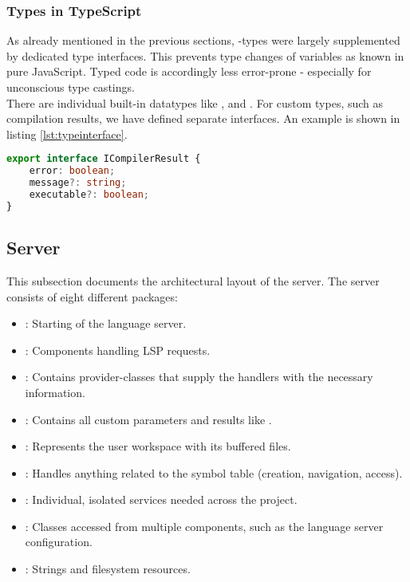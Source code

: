 \subsubsection{Types in TypeScript}
As already mentioned in the previous sections, -types were largely supplemented by dedicated type interfaces.
This prevents type changes of variables as known in pure JavaScript.
Typed code is accordingly less error-prone - especially for unconscious type castings. \\

There are individual built-in datatypes like ,  and  \cite{ts-types}.
For custom types, such as compilation results, we have defined separate interfaces.
An example is shown in listing \ref{lst:typeinterface}.

\begin{lstlisting}[language=typescript, caption={Type Interface Supplementing \code{any}-types}, captionpos=b, label={lst:typeinterface}]
export interface ICompilerResult {
    error: boolean;
    message?: string;
    executable?: boolean;
}
\end{lstlisting}




\subsection{Server}
This subsection documents the architectural layout of the server.
The server consists of eight different packages:
\begin{itemize}
    \item {}: Starting of the language server.
    \item {}: Components handling LSP requests.
    \item {}: Contains provider-classes that supply the handlers with the necessary information.
    \item {}: Contains all custom parameters and results like .
    \item {}: Represents the user workspace with its buffered files.
    \item {}: Handles anything related to the symbol table (creation, navigation, access).
    \item {}: Individual, isolated services needed across the project.
    \item {}: Classes accessed from multiple components, such as the language server configuration.
    \item {}: Strings and filesystem resources.
\end{itemize}


